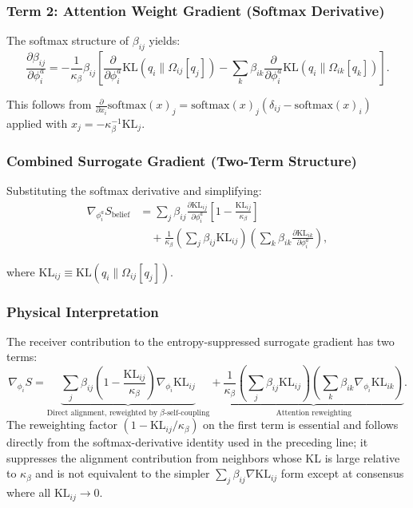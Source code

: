 \documentclass[11pt]{article}
\begin{document}
\subsubsection*{Term 2: Attention Weight Gradient (Softmax Derivative)}

The softmax structure of $\beta_{ij}$ yields:
\begin{equation}
\frac{\partial \beta_{ij}}{\partial \phi_i^a} = -\frac{1}{\kappa_\beta} \beta_{ij} \left[\frac{\partial}{\partial \phi_i^a}\mathrm{KL}(q_i \| \Omega_{ij}[q_j]) - \sum_k \beta_{ik} \frac{\partial}{\partial \phi_i^a}\mathrm{KL}(q_i \| \Omega_{ik}[q_k])\right].
\end{equation}

This follows from $\frac{\partial}{\partial x_i}\mathrm{softmax}(x)_j = \mathrm{softmax}(x)_j(\delta_{ij} - \mathrm{softmax}(x)_i)$ applied with $x_j = -\kappa_\beta^{-1}\mathrm{KL}_j$.

\subsubsection*{Combined Surrogate Gradient (Two-Term Structure)}

Substituting the softmax derivative and simplifying:
\begin{align}
\nabla_{\phi_i^a} S_{\mathrm{belief}} &= \sum_j \beta_{ij}\frac{\partial \mathrm{KL}_{ij}}{\partial \phi_i^a}\left[1 - \frac{\mathrm{KL}_{ij}}{\kappa_\beta}\right] \nonumber \\
&\quad + \frac{1}{\kappa_\beta}\left(\sum_j \beta_{ij}\mathrm{KL}_{ij}\right)\left(\sum_k \beta_{ik}\frac{\partial \mathrm{KL}_{ik}}{\partial \phi_i^a}\right),
\end{align}

where $\mathrm{KL}_{ij} \equiv \mathrm{KL}(q_i \| \Omega_{ij}[q_j])$.

\subsubsection*{Physical Interpretation}

The receiver contribution to the entropy-suppressed surrogate gradient has two terms:
\begin{equation}
\boxed{\nabla_{\phi_i} S = \underbrace{\sum_j \beta_{ij}\left(1 - \frac{\mathrm{KL}_{ij}}{\kappa_\beta}\right)\nabla_{\phi_i}\mathrm{KL}_{ij}}_{\text{Direct alignment, reweighted by }\beta\text{-self-coupling}} + \underbrace{\frac{1}{\kappa_\beta}\left(\sum_j \beta_{ij}\mathrm{KL}_{ij}\right) \left(\sum_k \beta_{ik}\nabla_{\phi_i}\mathrm{KL}_{ik}\right)}_{\text{Attention reweighting}}.}
\end{equation}
The reweighting factor $(1 - \mathrm{KL}_{ij}/\kappa_\beta)$ on the first term is essential and follows directly from the softmax-derivative identity used in the preceding line; it suppresses the alignment contribution from neighbors whose KL is large relative to $\kappa_\beta$ and is not equivalent to the simpler $\sum_j \beta_{ij}\nabla\mathrm{KL}_{ij}$ form except at consensus where all $\mathrm{KL}_{ij} \to 0$.
\end{document}

